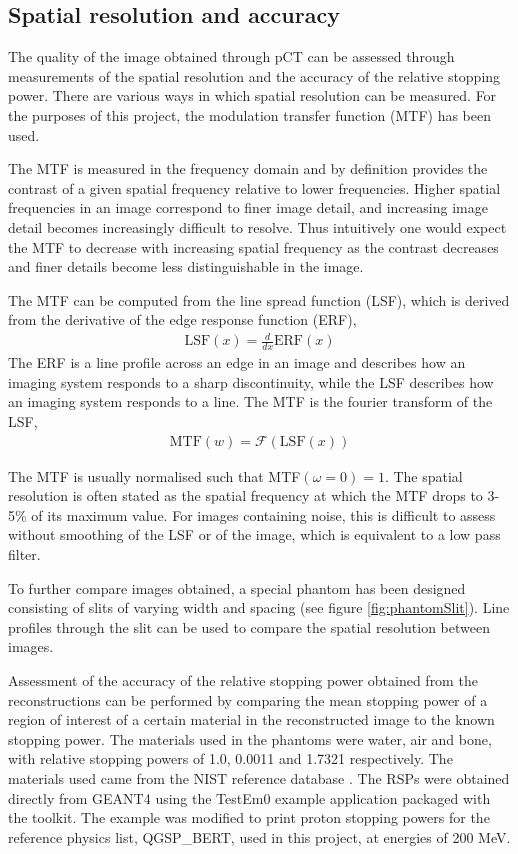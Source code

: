 \documentclass[11pt,a4paper]{article}
\begin{document}
\subsection{Spatial resolution and accuracy}
The quality of the image obtained through pCT can be assessed through measurements of the spatial resolution and the accuracy of the relative stopping power. There are various ways in which spatial resolution can be measured. For the purposes of this project, the modulation transfer function (MTF) has been used.

The MTF is measured in the frequency domain and by definition provides the contrast of a given spatial frequency relative to lower frequencies. Higher spatial frequencies in an image correspond to finer image detail, and increasing image detail becomes increasingly difficult to resolve. Thus intuitively one would expect the MTF to decrease with increasing spatial frequency as the contrast decreases and finer details become less distinguishable in the image. 

The MTF can be computed from the line spread function (LSF), which is derived from the derivative of the edge response function (ERF),
\begin{align}
\text{LSF}(x) = \frac{d}{dx}\text{ERF}(x)
\end{align}
The ERF is a line profile across an edge in an image and describes how an imaging system responds to a sharp discontinuity, while the LSF describes how an imaging system responds to a line. The MTF is the fourier transform of the LSF,
\begin{align}
\text{MTF}(w) = \mathcal{F}(\text{LSF}(x))
\end{align}

The MTF is usually normalised such that MTF$(\omega=0) =1$. The spatial resolution is often stated as the spatial frequency at which the MTF drops to 3-5\% of its maximum value. For images containing noise, this is difficult to assess without smoothing of the LSF or of the image, which is equivalent to a low pass filter.

To further compare images obtained, a special phantom has been designed consisting of slits of varying width and spacing (see figure \ref{fig:phantomSlit}). Line profiles through the slit can be used to compare the spatial resolution between images.

Assessment of the accuracy of the relative stopping power obtained from the reconstructions can be performed by comparing the mean stopping power of a region of interest of a certain material in the reconstructed image to the known stopping power. The materials used in the phantoms were water, air and bone, with relative stopping powers of 1.0, 0.0011 and 1.7321 respectively. The materials used came from the NIST reference database \cite{nist}. The RSPs were obtained directly from GEANT4 using the TestEm0 example application packaged with the toolkit. The example was modified to print proton stopping powers for the reference physics list, QGSP\_BERT, used in this project, at energies of 200 MeV.
\end{document}
